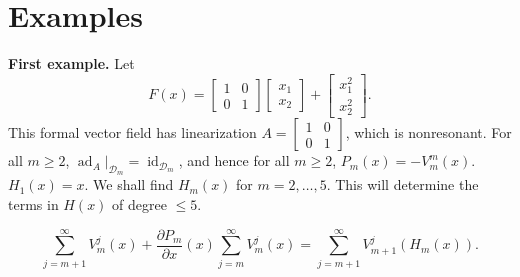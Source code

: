 \documentclass{article}
\newcommand{\ad}{\operatorname{ad}}
\newcommand{\id}{\operatorname{id}}
\begin{document}
\section{Examples}
\label{examples}
\textbf{First example.} Let 
\[
F(x)=\begin{bmatrix}1&0\\0&1\end{bmatrix}\begin{bmatrix}x_1\\x_2\end{bmatrix}
+\begin{bmatrix}x_1^2\\x_2^2\end{bmatrix}. 
\]
This formal vector field has linearization
$A=\begin{bmatrix}1&0\\0&1\end{bmatrix}$, which is nonresonant. For all $m \geq 2$, $\ad_A|_{\mathscr{D}_m}=\id_{\mathscr{D}_m}$, and hence for all $m \geq 2$, $P_m(x)=-V_m^m(x)$.
$H_1(x)=x$. We shall find $H_m(x)$ for $m=2,\ldots,5$. This will determine the terms in $H(x)$
of degree $\leq 5$.

\begin{equation}
\label{determinedby}
\sum_{j=m+1}^\infty V^j_m(x)
+
\frac{\partial P_m}{\partial x}(x)
\sum_{j=m}^\infty V^j_m(x)
=\sum_{j=m+1}^\infty V_{m+1}^j(H_m(x)).
\end{equation}
\end{document}
